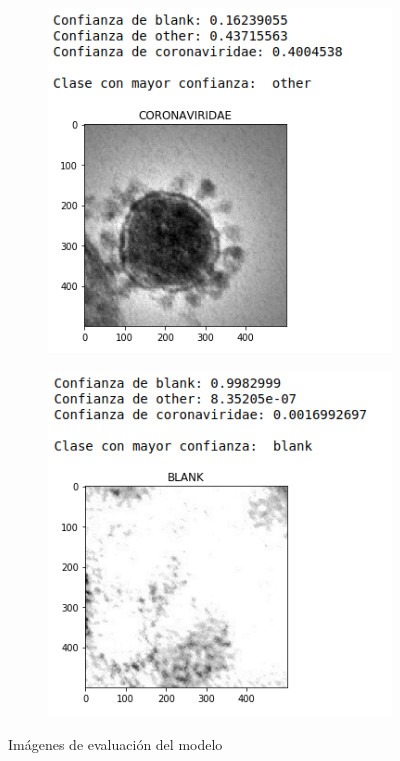 \documentclass{uc3mpracticas}
\begin{document}
\begin{figure}[!h]
\begin{subfigure}[b]{0.43\textwidth}
      \caption{}
    \end{subfigure}
    \hfill
    \begin{subfigure}[b]{0.43\textwidth}
      \includegraphics[width=\textwidth, frame]{Images/ev2.png}
      \caption{}
    \end{subfigure}
    \hfill
    \begin{subfigure}[b]{0.43\textwidth}
      \includegraphics[width=\textwidth, frame]{Images/ev4.png}
      \caption{}
    \end{subfigure}

    \caption{Imágenes de evaluación del modelo}
  \end{figure}
\end{document}
